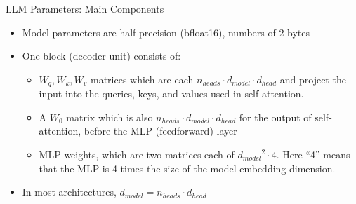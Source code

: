 



\def\myblue#1{\textcolor{texblue}{#1}}

\def\qmark{\myblue{?!?}}

\newcommand{\learninggoals}{
\item Learn to calculate Transformer number of parameters
\item Understand Transformer computation and memory load
\item Learn about Flash Attentions
\item Understand Scaling Laws and Chinchilla
}
\def\myblue#1{\textcolor{texblue}{#1}}

\title{}
\date{}







\begin{vbframe}{LLM Parameters: Main Components}

\vfill


\begin{itemize}
    \item Model parameters are half-precision (bfloat16), numbers of 2 bytes
    \item One block (decoder unit) consists of:
		\begin{itemize}
		\item $W_q, W_k, W_v$ matrices which are
    each $n_{heads} \cdot d_{model} \cdot  d_{head}$ and project the input into the queries, keys, and values used in self-attention. 
		\item A $W_0$ matrix which is also $n_{heads} \cdot d_{model} \cdot d_{head}$ for the output of self-attention, before the MLP (feedforward) layer
		\item MLP weights, which are two matrices
    each of ${d_{model}}^2 \cdot 4$. Here
    ``4''  means that the MLP is 4 times the size of the model embedding dimension. 
		\end{itemize}
	\item In most architectures, $d_{model} = n_{heads} \cdot d_{head}$
\end{itemize}

\vfill

\end{vbframe}


